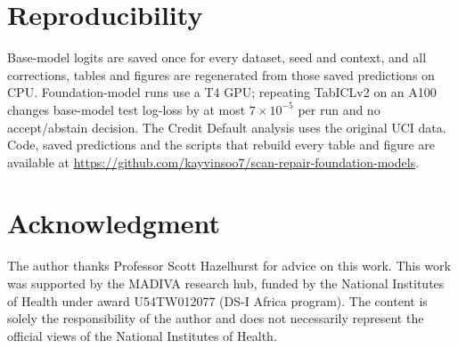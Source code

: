 \documentclass[conference]{IEEEtran}
\begin{document}
\section*{Reproducibility}
Base-model logits are saved once for every dataset, seed and context, and all corrections, tables
and figures are regenerated from those saved predictions on CPU. Foundation-model runs
use a T4 GPU; repeating TabICLv2 on an A100 changes base-model test log-loss by at most
$7\times10^{-5}$ per run and no accept/abstain decision. The Credit Default
analysis uses the original UCI data. Code, saved predictions and the scripts that rebuild every table and figure are available at \url{https://github.com/kayvinsoo7/scan-repair-foundation-models}.
\section*{Acknowledgment}
The author thanks Professor Scott Hazelhurst for advice on this work. This work was supported by the MADIVA
research hub, funded by the National Institutes of Health under award U54TW012077 (DS-I Africa
program). The content is solely the responsibility of the author and does not necessarily
represent the official views of the National Institutes of Health.



\end{document}
